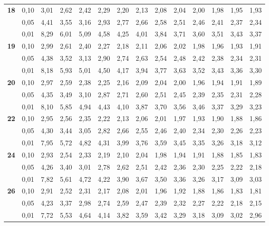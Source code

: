 \documentclass[12pt,a4paper]{article}
\begin{document}
{\begin{longtable}{@{\extracolsep{\fill}}rrrrrrrrrrrrrr@{}}
\addlinespace[1pt]
\textbf{18} & 0,10 & 3,01 & 2,62 & 2,42 & 2,29 & 2,20 & 2,13 & 2,08 & 2,04 & 2,00 & 1,98 & 1,95 & 1,93 \\*
 & 0,05 & 4,41 & 3,55 & 3,16 & 2,93 & 2,77 & 2,66 & 2,58 & 2,51 & 2,46 & 2,41 & 2,37 & 2,34 \\*
 & 0,01 & 8,29 & 6,01 & 5,09 & 4,58 & 4,25 & 4,01 & 3,84 & 3,71 & 3,60 & 3,51 & 3,43 & 3,37 \\
\addlinespace[1pt]
\textbf{19} & 0,10 & 2,99 & 2,61 & 2,40 & 2,27 & 2,18 & 2,11 & 2,06 & 2,02 & 1,98 & 1,96 & 1,93 & 1,91 \\*
 & 0,05 & 4,38 & 3,52 & 3,13 & 2,90 & 2,74 & 2,63 & 2,54 & 2,48 & 2,42 & 2,38 & 2,34 & 2,31 \\*
 & 0,01 & 8,18 & 5,93 & 5,01 & 4,50 & 4,17 & 3,94 & 3,77 & 3,63 & 3,52 & 3,43 & 3,36 & 3,30 \\
\addlinespace[1pt]
\textbf{20} & 0,10 & 2,97 & 2,59 & 2,38 & 2,25 & 2,16 & 2,09 & 2,04 & 2,00 & 1,96 & 1,94 & 1,91 & 1,89 \\*
 & 0,05 & 4,35 & 3,49 & 3,10 & 2,87 & 2,71 & 2,60 & 2,51 & 2,45 & 2,39 & 2,35 & 2,31 & 2,28 \\*
 & 0,01 & 8,10 & 5,85 & 4,94 & 4,43 & 4,10 & 3,87 & 3,70 & 3,56 & 3,46 & 3,37 & 3,29 & 3,23 \\
\addlinespace[1pt]
\textbf{22} & 0,10 & 2,95 & 2,56 & 2,35 & 2,22 & 2,13 & 2,06 & 2,01 & 1,97 & 1,93 & 1,90 & 1,88 & 1,86 \\*
 & 0,05 & 4,30 & 3,44 & 3,05 & 2,82 & 2,66 & 2,55 & 2,46 & 2,40 & 2,34 & 2,30 & 2,26 & 2,23 \\*
 & 0,01 & 7,95 & 5,72 & 4,82 & 4,31 & 3,99 & 3,76 & 3,59 & 3,45 & 3,35 & 3,26 & 3,18 & 3,12 \\
\addlinespace[1pt]
\textbf{24} & 0,10 & 2,93 & 2,54 & 2,33 & 2,19 & 2,10 & 2,04 & 1,98 & 1,94 & 1,91 & 1,88 & 1,85 & 1,83 \\*
 & 0,05 & 4,26 & 3,40 & 3,01 & 2,78 & 2,62 & 2,51 & 2,42 & 2,36 & 2,30 & 2,25 & 2,22 & 2,18 \\*
 & 0,01 & 7,82 & 5,61 & 4,72 & 4,22 & 3,90 & 3,67 & 3,50 & 3,36 & 3,26 & 3,17 & 3,09 & 3,03 \\
\addlinespace[1pt]
\textbf{26} & 0,10 & 2,91 & 2,52 & 2,31 & 2,17 & 2,08 & 2,01 & 1,96 & 1,92 & 1,88 & 1,86 & 1,83 & 1,81 \\*
 & 0,05 & 4,23 & 3,37 & 2,98 & 2,74 & 2,59 & 2,47 & 2,39 & 2,32 & 2,27 & 2,22 & 2,18 & 2,15 \\*
 & 0,01 & 7,72 & 5,53 & 4,64 & 4,14 & 3,82 & 3,59 & 3,42 & 3,29 & 3,18 & 3,09 & 3,02 & 2,96 \\

\end{longtable}}
\end{document}
